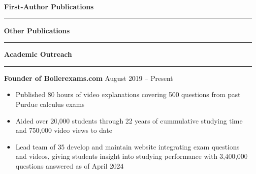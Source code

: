 \documentclass[11pt, a4paper]{article}
\newcommand{\sectiontitle}[1]{{\Large \textbf{#1}}\vspace{0.5em}\hrule\vspace{0.5em}}
\begin{document}

\nocite{*}
\sectiontitle{First-Author Publications}
\printbibliography[heading=none, notkeyword={nobib}, resetnumbers=true]

\sectiontitle{Other Publications}
\printbibliography[heading=none, keyword={nobib}, resetnumbers=true]

\pagebreak
\sectiontitle{Academic Outreach}
\textbf{Founder of Boilerexams.com} \hfill August 2019 -- Present
\begin{itemize}[noitemsep]
    \item Published 80 hours of video explanations covering 500 questions from past Purdue calculus exams
    \item Aided over 20,000 students through 22 years of cummulative studying time and 750,000 video views to date
    \item Lead team of 35 develop and maintain website integrating exam questions and videos, giving students
    insight into studying performance with 3,400,000 questions answered as of April 2024
\end{itemize}
\end{document}
